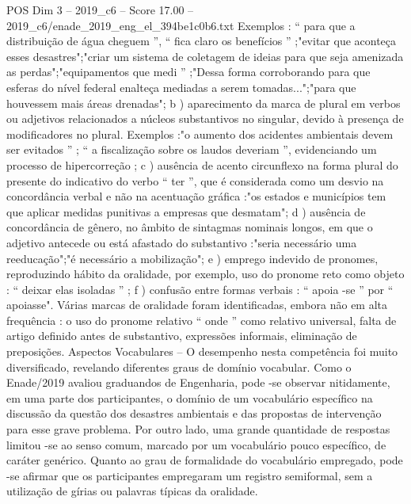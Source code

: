 \begin{textsample}{POS Dim 3 – 2019\_c6 – Score 17.00 – 2019\_c6/enade\_2019\_eng\_el\_394be1c0b6.txt}
Exemplos : “ para que a distribuição de água cheguem ”, “ fica claro os benefícios ” ;"evitar que aconteça esses desastres";"criar um sistema de coletagem de ideias para que seja amenizada as perdas";"equipamentos que medi ” ;"Dessa forma corroborando para que esferas do nível federal enalteça mediadas a serem tomadas...";"para que houvessem mais áreas drenadas"; b ) aparecimento da marca de plural em verbos ou adjetivos relacionados a núcleos substantivos no singular, devido à presença de modificadores no plural.
Exemplos :"o aumento dos acidentes ambientais devem ser evitados ” ; “ a fiscalização sobre os laudos deveriam ”, evidenciando um processo de hipercorreção ; c ) ausência de acento circunflexo na forma plural do presente do indicativo do verbo “ ter ”, que é considerada como um desvio na concordância verbal e não na acentuação gráfica :"os estados e municípios tem que aplicar medidas punitivas a empresas que desmatam"; d ) ausência de concordância de gênero, no âmbito de sintagmas nominais longos, em que o adjetivo antecede ou está afastado do substantivo :"seria necessário uma reeducação";"é necessário a mobilização"; e ) emprego indevido de pronomes, reproduzindo hábito da oralidade, por exemplo, uso do pronome reto como objeto : “ deixar elas isoladas ” ; f ) confusão entre formas verbais : “ apoia -se ” por “ apoiasse".
Várias marcas de oralidade foram identificadas, embora não em alta frequência : o uso do pronome relativo “ onde ” como relativo universal, falta de artigo definido antes de substantivo, expressões informais, eliminação de preposições.
Aspectos Vocabulares – O desempenho nesta competência foi muito diversificado, revelando diferentes graus de domínio vocabular.
Como o Enade/2019 avaliou graduandos de Engenharia, pode -se observar nitidamente, em uma parte dos participantes, o domínio de um vocabulário específico na discussão da questão dos desastres ambientais e das propostas de intervenção para esse grave problema.
Por outro lado, uma grande quantidade de respostas limitou -se ao senso comum, marcado por um vocabulário pouco específico, de caráter genérico.
Quanto ao grau de formalidade do vocabulário empregado, pode -se afirmar que os participantes empregaram um registro semiformal, sem a utilização de gírias ou palavras típicas da oralidade.

\end{textsample}
